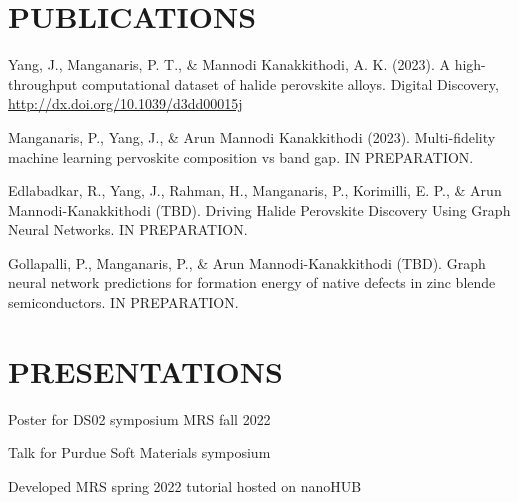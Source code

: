 \chapter*{PUBLICATIONS}
\label{sec:orga6f8028}
Yang, J., Manganaris, P. T., \& Mannodi Kanakkithodi, A. K. (2023). A high-throughput computational dataset of halide perovskite alloys. Digital Discovery, \url{http://dx.doi.org/10.1039/d3dd00015j}

Manganaris, P., Yang, J., \& Arun Mannodi Kanakkithodi (2023). Multi-fidelity machine learning pervoskite composition vs band gap. IN PREPARATION.

Edlabadkar, R., Yang, J., Rahman, H., Manganaris, P., Korimilli, E. P., \& Arun Mannodi-Kanakkithodi (TBD). Driving Halide Perovskite Discovery Using Graph Neural Networks. IN PREPARATION.

Gollapalli, P., Manganaris, P., \& Arun Mannodi-Kanakkithodi (TBD). Graph neural network predictions for formation energy of native defects in zinc blende semiconductors. IN PREPARATION.

\chapter*{PRESENTATIONS}
\label{sec:org037fe7a}
Poster for DS02 symposium MRS fall 2022

Talk for Purdue Soft Materials symposium

Developed MRS spring 2022 tutorial hosted on nanoHUB
